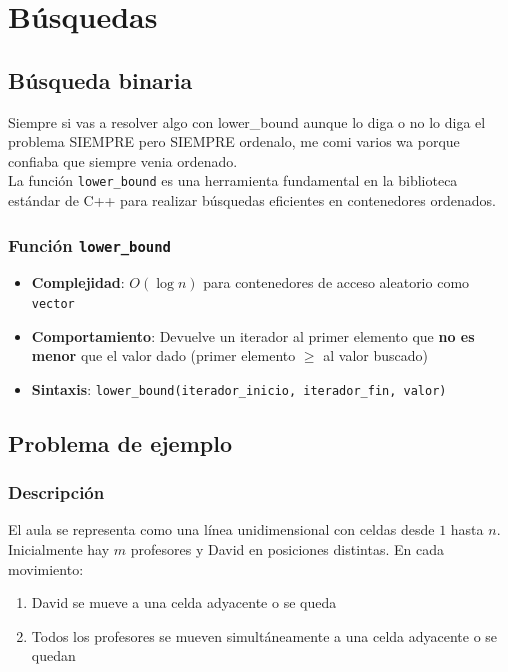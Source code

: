 \chapter{Búsquedas}

\section{Búsqueda binaria}
Siempre si vas a resolver algo con lower\_bound aunque lo diga o no lo diga el problema SIEMPRE pero SIEMPRE ordenalo, me comi varios wa porque confiaba que siempre venia ordenado. \\ 
La función \texttt{lower\_bound} es una herramienta fundamental en la biblioteca estándar de C++ para realizar búsquedas eficientes en contenedores ordenados.

\subsection{Función \texttt{lower\_bound}}
\begin{itemize}
	\item \textbf{Complejidad}: $O(\log n)$ para contenedores de acceso aleatorio como \texttt{vector}
	\item \textbf{Comportamiento}: Devuelve un iterador al primer elemento que \textbf{no es menor} que el valor dado (primer elemento $\geq$ al valor buscado)
	\item \textbf{Sintaxis}: \texttt{lower\_bound(iterador\_inicio, iterador\_fin, valor)}
\end{itemize}

\section{Problema de ejemplo}

\subsection{Descripción}
El aula se representa como una línea unidimensional con celdas desde $1$ hasta $n$. Inicialmente hay $m$ profesores y David en posiciones distintas. En cada movimiento:
\begin{enumerate}
	\item David se mueve a una celda adyacente o se queda
	\item Todos los profesores se mueven simultáneamente a una celda adyacente o se quedan
\end{enumerate}

